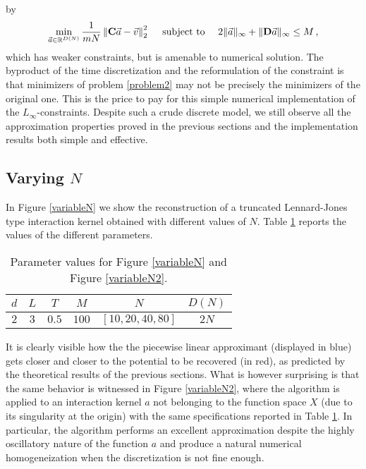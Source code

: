 by
\begin{align}\label{problem2}
\min_{\vec{a} \in \mathbb{R}^{D(N)}} \frac{1}{mN} \left\|\mathbf C \vec{a} - \vec v \right\|^2_{2} \quad \text{ subject to } \quad 2\|\vec{a}\|_{\infty} + \|\mathbf D\vec{a}\|_{\infty} \leq M\,,
\end{align}
which has weaker constraints, but is amenable to numerical solution.
The byproduct of the time discretization and the reformulation of the constraint is that minimizers of problem \eqref{problem2} may not be precisely the minimizers of the original one. This is the price to pay for this simple numerical implementation of the $L_\infty$-constraints. Despite such a crude discrete model,  we still observe all the approximation properties proved in the previous sections and the implementation results both simple and effective.

\subsection{Varying $N$}

In Figure \ref{variableN} we show the reconstruction of a truncated Lennard-Jones type interaction kernel obtained with different values of $N$. Table \ref{tab:fig1} reports the values of the different parameters.

\begin{table}[h!]%
\begin{center}
\begin{tabular}{ |c|c|c|c|c|c| }
\hline
  $d$ & $L$ & $T$ & $M$ & $N$ & $D(N)$ \\
\hline
\hline
  $2$ & $3$ & $0.5$ & $100$ & $[10,20,40,80]$ & $2N$ \\
\hline
\end{tabular}
\end{center}
\vspace{-0.5cm}
\caption{Parameter values for Figure \ref{variableN} and Figure \ref{variableN2}.} \label{tab:fig1} 
\end{table}

It is clearly visible how the the piecewise linear approximant (displayed in blue) gets closer and closer to the potential to be recovered (in red), as predicted by the theoretical results of the previous sections. What is however surprising is that the same behavior is witnessed in Figure \ref{variableN2}, where the algorithm is applied to an interaction kernel $a$ not belonging to the function space $X$ (due to its singularity at the origin) with the same specifications reported in Table \ref{tab:fig1}. In particular, the algorithm performs an excellent approximation despite the highly oscillatory nature of the function $a$ and produce a natural numerical homogeneization when the discretization is not fine enough.

